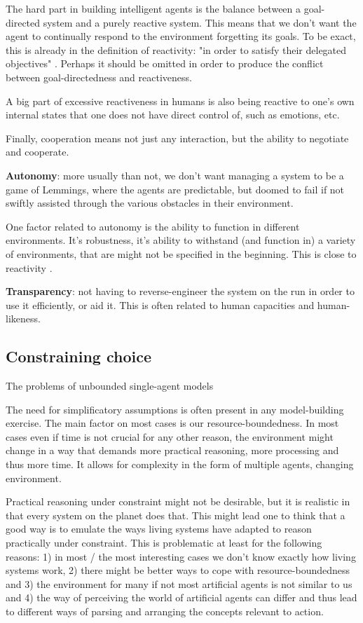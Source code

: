 The hard part in building intelligent agents is the balance between a goal-directed system and a purely reactive system. This means that we don't want the agent to continually respond to the environment forgetting its goals. To be exact, this is already in the definition of reactivity: "in order to satisfy their delegated objectives" \citep[p.~8]{wooldridge_intelligent_2013} . Perhaps it should be omitted in order to produce the conflict between goal-directedness and reactiveness.

A big part of excessive reactiveness in humans is also being reactive to one's own internal states that one does not have direct control of, such as emotions, etc.

Finally, cooperation means not just any interaction, but the ability to negotiate and cooperate.

\textbf{Autonomy}: more usually than not, we don’t want managing a system to be a game of Lemmings, where the agents are predictable, but doomed to fail if not swiftly assisted through the various obstacles in their environment.

One factor related to autonomy is the ability to function in different environments. It’s robustness, it’s ability to withstand (and function in) a variety of environments, that are might not be specified in the beginning. This is close to reactivity \citep[p.~8]{wooldridge_intelligent_2013} .

\textbf{Transparency}: not having to reverse-engineer the system on the run in order to use it efficiently, or aid it. This is often related to human capacities and human-likeness.

\subsection{Constraining choice}
The problems of unbounded single-agent models

The need for simplificatory assumptions is often present in any model-building exercise. The main factor on most cases is our resource-boundedness. In most cases even if time is not crucial for any other reason, the environment might change in a way that demands more practical reasoning, more processing and thus more time. It allows for complexity in the form of multiple agents, changing environment.

Practical reasoning under constraint might not be desirable, but it is realistic in that every system on the planet does that. This might lead one to think that a good way is to emulate the ways living systems have adapted to reason practically under constraint. This is problematic at least for the following reasons: 1) in most / the most interesting cases we don't know exactly how living systems work, 2) there might be better ways to cope with resource-boundedness and 3) the environment for many if not most artificial agents is not similar to us and 4) the way of perceiving the world of artificial agents can differ and thus lead to different ways of parsing and arranging the concepts relevant to action.

